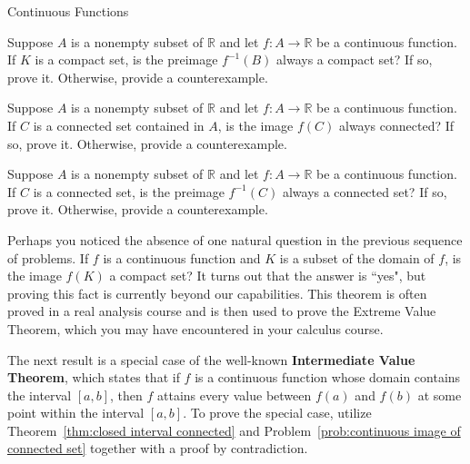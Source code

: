 \begin{section}{Continuous Functions}
\begin{problem}
Suppose $A$ is a nonempty subset of $\mathbb{R}$ and let $f:A\to \mathbb{R}$ be a continuous function. If $K$ is a compact set, is the preimage $f^{-1}(B)$ always a compact set? If so, prove it.  Otherwise, provide a counterexample.
\end{problem}




\begin{problem}\label{prob:continuous image of connected set}
Suppose $A$ is a nonempty subset of $\mathbb{R}$ and let $f:A\to \mathbb{R}$ be a continuous function. If $C$ is a connected set contained in $A$, is the image $f(C)$ always connected?  If so, prove it.  Otherwise, provide a counterexample.
\end{problem}

\begin{problem}
Suppose $A$ is a nonempty subset of $\mathbb{R}$ and let $f:A\to \mathbb{R}$ be a continuous function. If $C$ is a connected set, is the preimage $f^{-1}(C)$ always a connected set? If so, prove it.  Otherwise, provide a counterexample.
\end{problem}

Perhaps you noticed the absence of one natural question in the previous sequence of problems. If $f$ is a continuous function and $K$ is a subset of the domain of $f$, is the image $f(K)$ a compact set?  It turns out that the answer is ``yes", but proving this fact is currently beyond our capabilities. This theorem is often proved in a real analysis course and is then used to prove the Extreme Value Theorem, which you may have encountered in your calculus course.

The next result is a special case of the well-known \textbf{Intermediate Value Theorem}, which states that if $f$ is a continuous function whose domain contains the interval $[a,b]$, then $f$ attains every value between $f(a)$ and $f(b)$ at some point within the interval $[a,b]$. To prove the special case, utilize Theorem~\ref{thm:closed interval connected} and Problem~\ref{prob:continuous image of connected set} together with a proof by contradiction.


\end{section}
